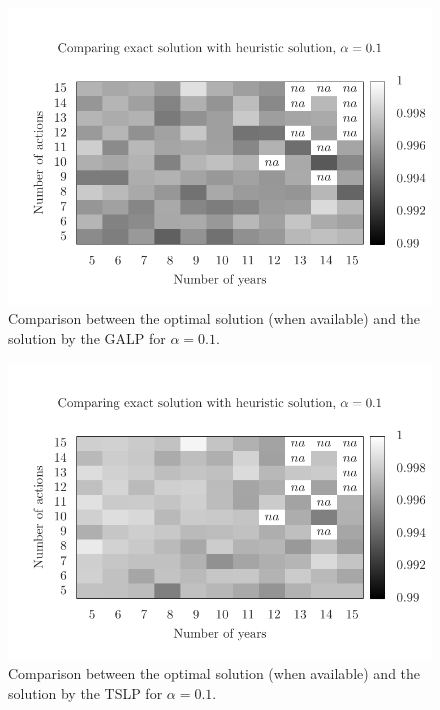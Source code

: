 \begin{figure}
\centering
\includegraphics[scale=0.73, trim=0.75cm 0cm 0 2cm, clip=true]{imgs/comp_hard.pdf}
\caption{Comparison between the optimal solution (when available) 
and the solution by the GALP for $\alpha=0.1$.}
\label{fig:mh1_2}
\end{figure}

\begin{figure}
\centering
\includegraphics[scale=0.73, trim=0.75cm 0cm 0 2cm, clip=true]{imgs/comp_hard_ts.pdf}
\caption{Comparison between the optimal solution (when available) 
and the solution by the TSLP for $\alpha=0.1$.}
\label{fig:mh2_2}
\end{figure}
 

